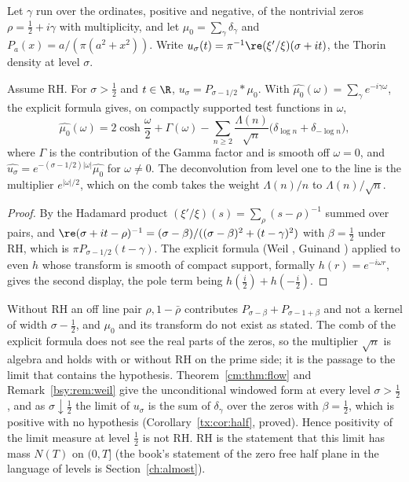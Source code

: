 Let $\gamma$ run over the ordinates, positive and negative, of the nontrivial zeros $\rho=\frac12+i\gamma$ with multiplicity, and let $\mu_0=\sum_\gamma\delta_\gamma$ and $P_a(x)=a/(\pi(a^2+x^2))$. Write $u_\sigma(t)=\pi^{-1}\re(\xi'/\xi)(\sigma+it)$, the Thorin density at level $\sigma$.

\begin{proposition}[conditional on RH]\label{bk:prop:cauchy}
Assume RH. For $\sigma>\frac12$ and $t\in\R$, $u_\sigma=P_{\sigma-1/2}*\mu_0$. With $\widehat{\mu_0}(\omega)=\sum_\gamma e^{-i\gamma\omega}$, the explicit formula gives, on compactly supported test functions in $\omega$,
\[
\widehat{\mu_0}(\omega)=2\cosh\frac\omega2+\Gamma(\omega)-\sum_{n\ge2}\frac{\Lambda(n)}{\sqrt n}\big(\delta_{\log n}+\delta_{-\log n}\big),
\]
where $\Gamma$ is the contribution of the Gamma factor and is smooth off $\omega=0$, and $\widehat{u_\sigma}=e^{-(\sigma-1/2)|\omega|}\widehat{\mu_0}$ for $\omega\ne0$. The deconvolution from level one to the line is the multiplier $e^{|\omega|/2}$, which on the comb takes the weight $\Lambda(n)/n$ to $\Lambda(n)/\sqrt n$.
\end{proposition}

\begin{proof}
By the Hadamard product $(\xi'/\xi)(s)=\sum_\rho(s-\rho)^{-1}$ summed over pairs, and $\re(\sigma+it-\rho)^{-1}=(\sigma-\beta)/((\sigma-\beta)^2+(t-\gamma)^2)$ with $\beta=\frac12$ under RH, which is $\pi P_{\sigma-1/2}(t-\gamma)$. The explicit formula (Weil \cite{Weil52}, Guinand \cite{Guinand48}) applied to even $h$ whose transform is smooth of compact support, formally $h(r)=e^{-i\omega r}$, gives the second display, the pole term being $h(\frac i2)+h(-\frac i2)$.
\end{proof}

Without RH an off line pair $\rho,1-\bar\rho$ contributes $P_{\sigma-\beta}+P_{\sigma-1+\beta}$ and not a kernel of width $\sigma-\frac12$, and $\mu_0$ and its transform do not exist as stated. The comb of the explicit formula does not see the real parts of the zeros, so the multiplier $\sqrt n$ is algebra and holds with or without RH on the prime side; it is the passage to the limit that contains the hypothesis. Theorem~\ref{cm:thm:flow} and Remark~\ref{bsy:rem:weil} give the unconditional windowed form at every level $\sigma>\frac12$, and as $\sigma\downarrow\frac12$ the limit of $u_\sigma$ is the sum of $\delta_\gamma$ over the zeros with $\beta=\frac12$, which is positive with no hypothesis (Corollary~\ref{tx:cor:half}, proved). Hence positivity of the limit measure at level $\frac12$ is not RH. RH is the statement that this limit has mass $N(T)$ on $(0,T]$ (the book's statement of the zero free half plane in the language of levels is Section~\ref{ch:almost}).
